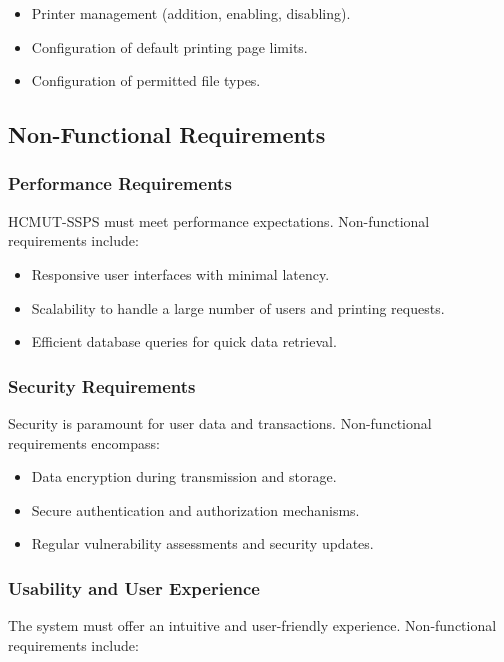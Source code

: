 \documentclass{article}
\begin{document}
\begin{itemize}
    \item Printer management (addition, enabling, disabling).
    \item Configuration of default printing page limits.
    \item Configuration of permitted file types.
\end{itemize}

\subsection{Non-Functional Requirements}

\subsubsection{Performance Requirements}
HCMUT-SSPS must meet performance expectations. Non-functional requirements include:

\begin{itemize}
    \item Responsive user interfaces with minimal latency.
    \item Scalability to handle a large number of users and printing requests.
    \item Efficient database queries for quick data retrieval.
\end{itemize}

\subsubsection{Security Requirements}
Security is paramount for user data and transactions. Non-functional requirements encompass:

\begin{itemize}
    \item Data encryption during transmission and storage.
    \item Secure authentication and authorization mechanisms.
    \item Regular vulnerability assessments and security updates.
\end{itemize}

\subsubsection{Usability and User Experience}
The system must offer an intuitive and user-friendly experience. Non-functional requirements include:
\end{document}
